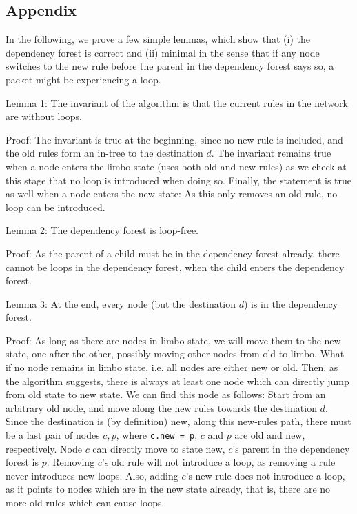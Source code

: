 \subsection{Appendix} 

In the following, we prove a few simple lemmas, which show that (i) the dependency forest is correct and (ii) minimal in the sense that if any node switches to the new rule before the parent in the dependency forest says so, a packet might be experiencing a loop.

Lemma 1: The invariant of the algorithm is that the current rules in the network are without loops.

Proof: The invariant is true at the beginning, since no new rule is included, and the old rules form an in-tree to the destination $d$. The invariant remains true when a node enters the limbo state (uses both old and new rules) as we check at this stage that no loop is introduced when doing so. Finally, the statement is true as well when a node enters the new state: As this only removes an old rule, no loop can be introduced.

Lemma 2: The dependency forest is loop-free.

Proof: As the parent of a child must be in the dependency forest already, there cannot be loops in the dependency forest, when the child enters the dependency forest.

Lemma 3: At the end, every node (but the destination $d$) is in the dependency forest.

Proof: As long as there are nodes in limbo state, we will move them to the new state, one after the other, possibly moving other nodes from old to limbo. What if no node remains in limbo state, i.e. all nodes are either new or old. Then, as the algorithm suggests, there is always at least one node which can directly jump from old state to new state. We can find this node as follows: Start from an arbitrary old node, and move along the new rules towards the destination $d$. Since the destination is (by definition) new, along this new-rules path, there must be a last pair of nodes $c,p$, where \texttt{c.new = p}, $c$ and $p$ are old and new, respectively. Node $c$ can directly move to state new, $c$'s parent in the dependency forest is $p$. Removing $c$'s old rule will not introduce a loop, as removing a rule never introduces new loops. Also, adding $c$'s new rule does not introduce a loop, as it points to nodes which are in the new state already, that is, there are no more old rules which can cause loops.

